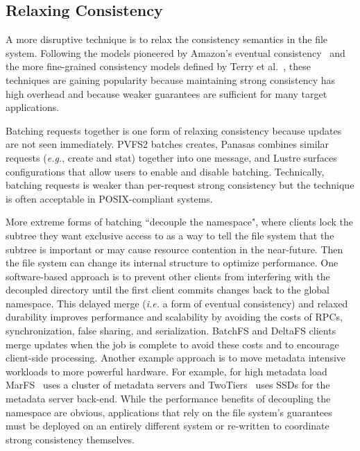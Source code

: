 \subsection{Relaxing Consistency}
\label{sec:relaxing-consistency}

A more disruptive technique is to relax the consistency semantics in the file
system.  Following the models pioneered by Amazon's eventual
consistency~\cite{decandia:sosp2007-dynamo} and the more fine-grained
consistency models defined by Terry et al.~\cite{terry_replicated_2013}, these
techniques are gaining popularity because maintaining strong consistency has
high overhead and because weaker guarantees are sufficient for many target
applications. 

Batching requests together is one form of relaxing consistency because updates
are not seen immediately. PVFS2 batches creates, Panasas combines similar
requests ({\it e.g.}, create and stat) together into one message, and Lustre
surfaces configurations that allow users to enable and disable batching.
Technically, batching requests is weaker than per-request strong consistency
but the technique is often acceptable in POSIX-compliant systems.

More extreme forms of batching ``decouple the namespace", where clients lock
the subtree they want exclusive access to as a way to tell the file system that
the subtree is important or may cause resource contention in the near-future.
Then the file system can change its internal structure to optimize performance.
One software-based approach is to prevent other clients from interfering with
the decoupled directory until the first client commits changes back to the
global namespace. This delayed merge ({\it i.e.} a form of eventual
consistency) and relaxed durability improves performance and scalability by
avoiding the costs of RPCs, synchronization, false sharing, and serialization.
BatchFS and DeltaFS clients merge updates when the job is complete to avoid
these costs and to encourage client-side processing. Another example approach
is to move metadata intensive workloads to more powerful hardware. For example,
for high metadata load MarFS~\cite{grider:pdsw2015-marfs} uses a cluster of
metadata servers and TwoTiers~\cite{bent:slides-twotiers} uses SSDs for the
metadata server back-end.  While the performance benefits of decoupling the
namespace are obvious, applications that rely on the file system's guarantees
must be deployed on an entirely different system or re-written to coordinate
strong consistency themselves.  

